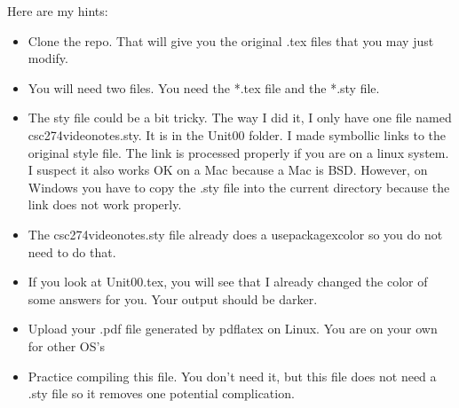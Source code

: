\documentclass{article}
\begin{document}
Here are my hints:
\begin{itemize}
    \item Clone the repo.  That will give you the original .tex files that you may just modify.
    \item You will need two files.  You need the *.tex file and the *.sty file.
    \item The sty file could be a bit tricky.  The way I did it, I only have one file named csc274videonotes.sty.  It is in the Unit00 folder.  I made symbollic links to the original style file.  The link is processed properly if you are on a linux system.  I suspect it also works OK on a Mac because a Mac is BSD.  However, on Windows you have to copy the .sty file into the current directory because the link does not work properly.
    \item The csc274videonotes.sty file already does a usepackage{xcolor} so you do not need to do that.  
    \item If you look at Unit00.tex, you will see that I already changed the color of some answers for you.  Your output should be darker.
    \item Upload your .pdf file generated by pdflatex on Linux.  You are on your own for other OS's
    \item Practice compiling this file.  You don't need it, but this file does not need a .sty file so it removes one potential complication.
\end{itemize}
\end{document}

